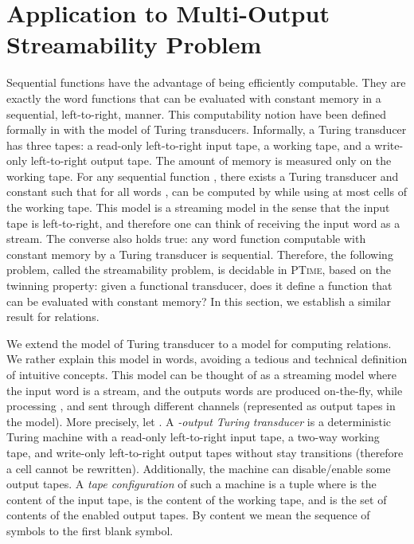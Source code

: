 \documentclass[envcountsame]{llncs}
\begin{document}
\section{Application to Multi-Output Streamability Problem}

Sequential functions have the advantage of being efficiently
computable. They are exactly the word functions that can be evaluated
with constant memory in a sequential, left-to-right, manner. This
computability notion have been defined formally in
\cite{DBLP:conf/fsttcs/FiliotGRS11} with the model of Turing
transducers. Informally, a Turing transducer has three tapes: a
read-only left-to-right input tape, a working tape, and a write-only
left-to-right output tape. The amount of memory is measured only on
the working tape. For any sequential function , there exists a
Turing transducer  and constant  such that for all words ,  can be computed by  while using at most  cells of
the working tape. This model is a streaming model in the sense that 
the input tape is left-to-right, and therefore one can think of
receiving the input word  as a stream. The converse also holds
true: any word function computable with constant memory by a Turing
transducer is sequential. Therefore, the following problem, called the
streamability problem, is decidable in \textsc{PTime}, based on the
twinning property: given a functional transducer, does it define a
function that can be evaluated with constant memory? In this section,
we establish a similar result for relations. 


We extend the model of Turing transducer to a model for computing
relations. We rather explain this model in words, avoiding a tedious
and technical definition of intuitive concepts. This model can be thought of as a streaming model where the input
word  is a stream, and the outputs words are produced on-the-fly, while
processing , and sent through different channels (represented as
output tapes in the model). More precisely, let . 
A \emph{-output Turing
transducer}  is a deterministic Turing machine with  a read-only
left-to-right input tape,  a two-way working tape, and  
write-only left-to-right output tapes without stay
transitions (therefore a cell cannot be rewritten). Additionally, the
machine can disable/enable some output tapes. A \emph{tape
  configuration} of such a machine is a tuple  where  is
the content of the input tape,  is the content of the working tape,
and  is the set of contents of the enabled output tapes. By content we mean the sequence of
symbols to the first blank symbol.
\end{document}
